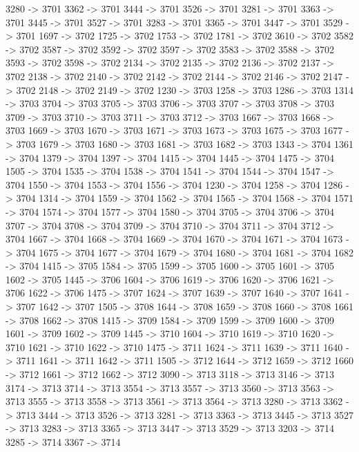 {	3280 -> 3701
	3362 -> 3701
	3444 -> 3701
	3526 -> 3701
	3281 -> 3701
	3363 -> 3701
	3445 -> 3701
	3527 -> 3701
	3283 -> 3701
	3365 -> 3701
	3447 -> 3701
	3529 -> 3701
	1697 -> 3702
	1725 -> 3702
	1753 -> 3702
	1781 -> 3702
	3610 -> 3702
	3582 -> 3702
	3587 -> 3702
	3592 -> 3702
	3597 -> 3702
	3583 -> 3702
	3588 -> 3702
	3593 -> 3702
	3598 -> 3702
	2134 -> 3702
	2135 -> 3702
	2136 -> 3702
	2137 -> 3702
	2138 -> 3702
	2140 -> 3702
	2142 -> 3702
	2144 -> 3702
	2146 -> 3702
	2147 -> 3702
	2148 -> 3702
	2149 -> 3702
	1230 -> 3703
	1258 -> 3703
	1286 -> 3703
	1314 -> 3703
	3704 -> 3703
	3705 -> 3703
	3706 -> 3703
	3707 -> 3703
	3708 -> 3703
	3709 -> 3703
	3710 -> 3703
	3711 -> 3703
	3712 -> 3703
	1667 -> 3703
	1668 -> 3703
	1669 -> 3703
	1670 -> 3703
	1671 -> 3703
	1673 -> 3703
	1675 -> 3703
	1677 -> 3703
	1679 -> 3703
	1680 -> 3703
	1681 -> 3703
	1682 -> 3703
	1343 -> 3704
	1361 -> 3704
	1379 -> 3704
	1397 -> 3704
	1415 -> 3704
	1445 -> 3704
	1475 -> 3704
	1505 -> 3704
	1535 -> 3704
	1538 -> 3704
	1541 -> 3704
	1544 -> 3704
	1547 -> 3704
	1550 -> 3704
	1553 -> 3704
	1556 -> 3704
	1230 -> 3704
	1258 -> 3704
	1286 -> 3704
	1314 -> 3704
	1559 -> 3704
	1562 -> 3704
	1565 -> 3704
	1568 -> 3704
	1571 -> 3704
	1574 -> 3704
	1577 -> 3704
	1580 -> 3704
	3705 -> 3704
	3706 -> 3704
	3707 -> 3704
	3708 -> 3704
	3709 -> 3704
	3710 -> 3704
	3711 -> 3704
	3712 -> 3704
	1667 -> 3704
	1668 -> 3704
	1669 -> 3704
	1670 -> 3704
	1671 -> 3704
	1673 -> 3704
	1675 -> 3704
	1677 -> 3704
	1679 -> 3704
	1680 -> 3704
	1681 -> 3704
	1682 -> 3704
	1415 -> 3705
	1584 -> 3705
	1599 -> 3705
	1600 -> 3705
	1601 -> 3705
	1602 -> 3705
	1445 -> 3706
	1604 -> 3706
	1619 -> 3706
	1620 -> 3706
	1621 -> 3706
	1622 -> 3706
	1475 -> 3707
	1624 -> 3707
	1639 -> 3707
	1640 -> 3707
	1641 -> 3707
	1642 -> 3707
	1505 -> 3708
	1644 -> 3708
	1659 -> 3708
	1660 -> 3708
	1661 -> 3708
	1662 -> 3708
	1415 -> 3709
	1584 -> 3709
	1599 -> 3709
	1600 -> 3709
	1601 -> 3709
	1602 -> 3709
	1445 -> 3710
	1604 -> 3710
	1619 -> 3710
	1620 -> 3710
	1621 -> 3710
	1622 -> 3710
	1475 -> 3711
	1624 -> 3711
	1639 -> 3711
	1640 -> 3711
	1641 -> 3711
	1642 -> 3711
	1505 -> 3712
	1644 -> 3712
	1659 -> 3712
	1660 -> 3712
	1661 -> 3712
	1662 -> 3712
	3090 -> 3713
	3118 -> 3713
	3146 -> 3713
	3174 -> 3713
	3714 -> 3713
	3554 -> 3713
	3557 -> 3713
	3560 -> 3713
	3563 -> 3713
	3555 -> 3713
	3558 -> 3713
	3561 -> 3713
	3564 -> 3713
	3280 -> 3713
	3362 -> 3713
	3444 -> 3713
	3526 -> 3713
	3281 -> 3713
	3363 -> 3713
	3445 -> 3713
	3527 -> 3713
	3283 -> 3713
	3365 -> 3713
	3447 -> 3713
	3529 -> 3713
	3203 -> 3714
	3285 -> 3714
	3367 -> 3714
}
